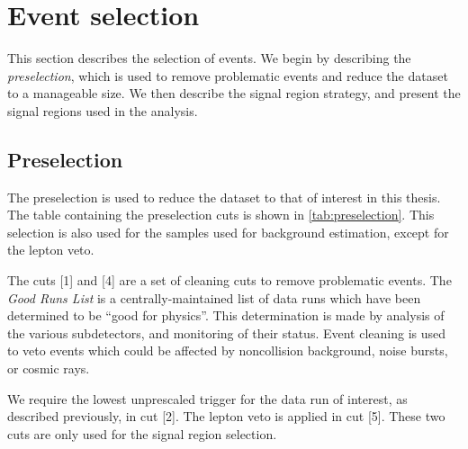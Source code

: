

\section{Event selection}

This section describes the selection of events.
We begin by describing the \textit{preselection}, which is used to remove problematic events and reduce the dataset to a manageable size.
We then describe the signal region strategy, and present the signal regions used in the analysis.

\subsection{Preselection}

The preselection is used to reduce the dataset to that of interest in this thesis.
The table containing the preselection cuts is shown in \ref{tab:preselection}.
This selection is also used for the samples used for background estimation, except for the lepton veto.

The cuts [1] and [4] are a set of cleaning cuts to remove problematic events.
The \textit{Good Runs List} is a centrally-maintained list of data runs which have been determined to be ``good for physics''.
This determination is made by analysis of the various subdetectors, and monitoring of their status.
Event cleaning is used to veto events which could be affected by noncollision background, noise bursts, or cosmic rays.


We require the lowest unprescaled \met trigger for the data run of interest, as described previously, in cut [2].
The lepton veto is applied in cut [5].
These two cuts are only used for the signal region selection.

